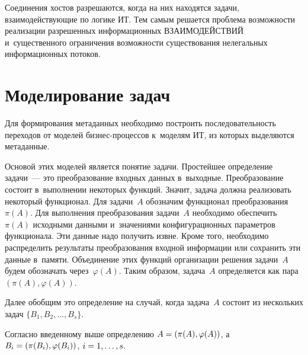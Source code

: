 \begin{multicols}{2}
  Соединения хостов разрешаются, когда на них находятся задачи, 
вза\-имо\-дей\-ст\-ву\-ющие по логике ИТ. Тем самым решается проб\-ле\-ма воз\-мож\-ности 
реализации разрешенных информационных ВЗАИМОДЕЙСТВИЙ 
и~существенного ограничения воз\-мож\-ности существования нелегальных 
информационных потоков. 

\vspace*{-9pt}
  
\section{Моделирование задач}

  Для формирования метаданных необходимо по\-стро\-ить по\-сле\-до\-ва\-тель\-ность 
переходов от моделей биз\-нес-про\-цес\-сов к~моделям ИТ, из которых 
выделяются метаданные.
  
  Основой этих моделей является понятие задачи. Простейшее определение 
задачи~--- это преобразование вход\-ных данных в~выходные. 
Преобразование со\-сто\-ит в~выполнении некоторых функций. Значит, задача должна 
реализовать некоторый функционал. Для задачи~$A$ обозначим функционал 
преобразования $\pi(A)$. Для выполнения преобразования задачи~$A$ 
необходимо обеспечить~$\pi(A)$ исходными данными и~значениями 
конфигурационных па\-ра\-мет\-ров функционала. Эти данные надо получить извне. 
Кроме того, необходимо распределить результаты преобразования входной 
информации или сохранить эти данные в~памяти. Объединение этих функций 
организации решения задачи~$A$ будем обозначать через~$\varphi(A)$. Таким 
образом, задача~$A$ определяется как пара $(\pi (A), \varphi (A))$.
  
  Далее обобщим это определение на случай, когда задача~$A$ со\-сто\-ит из 
нескольких задач $\{B_1, B_2,\ldots , B_s\}$.
  
  Согласно введенному выше определению $A\hm = (\pi (A), \varphi (A))$, 
а~$B_i\hm = (\pi (B_i), \varphi (B_i))$, $i\hm=1,\ldots , s$. 
  
  \smallskip
  

\end{multicols}
